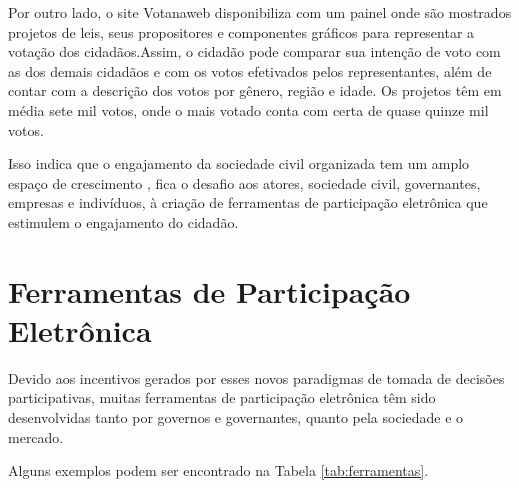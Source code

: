 \par
Por outro lado, o site Votanaweb disponibiliza com um painel onde são mostrados projetos de leis, seus propositores e componentes gráficos para representar a votação dos cidadãos.Assim, o cidadão pode comparar sua intenção de voto com as dos demais cidadãos e com os votos efetivados pelos representantes, além de contar com a descrição dos votos por gênero, região e idade. Os projetos têm em média sete mil votos, onde o mais votado conta com certa de quase quinze mil votos. 

\par
Isso indica que o engajamento da sociedade civil organizada tem um amplo espaço de crescimento \cite{o2011government}, fica o desafio aos atores, sociedade civil, governantes, empresas e indivíduos, à criação de ferramentas de participação eletrônica que estimulem o engajamento do cidadão.

\section{Ferramentas de Participação Eletrônica}
\label{sec:e-part tools}
Devido aos incentivos gerados por esses novos paradigmas de tomada de decisões participativas, muitas ferramentas de participação eletrônica têm sido desenvolvidas
tanto por governos e governantes, quanto pela sociedade e o mercado. 
\par
Alguns exemplos podem ser encontrado na Tabela \ref{tab:ferramentas}.


